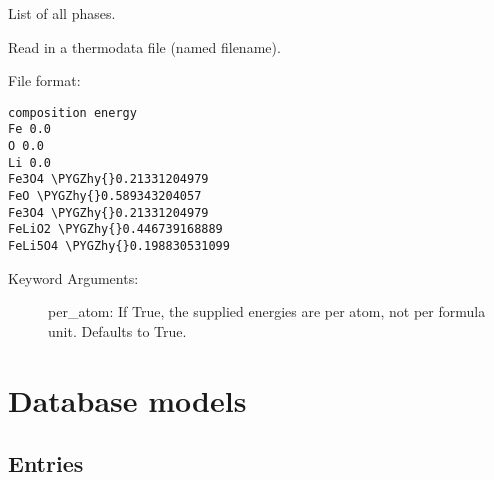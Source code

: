 \documentclass[letterpaper,10pt,english]{sphinxmanual}
\def\PYGZhy{\char`\-}
\begin{document}
\begin{fulllineitems}

\begin{fulllineitems}
\label{models:qmpy.PhaseData.phases}
List of all phases.

\end{fulllineitems}


\begin{fulllineitems}
\label{models:qmpy.PhaseData.read_file}
Read in a thermodata file (named filename).

File format:

\begin{Verbatim}[commandchars=\\\{\}]
composition energy
Fe 0.0
O 0.0
Li 0.0
Fe3O4 \PYGZhy{}0.21331204979
FeO \PYGZhy{}0.589343204057
Fe3O4 \PYGZhy{}0.21331204979
FeLiO2 \PYGZhy{}0.446739168889
FeLi5O4 \PYGZhy{}0.198830531099
\end{Verbatim}
\begin{description}
\item[{Keyword Arguments:}] \leavevmode
per\_atom: If True, the supplied energies are per atom, not per
formula unit. Defaults to True.

\end{description}

\end{fulllineitems}


\end{fulllineitems}



\section{Database models}
\label{models:database-models}

\subsection{Entries}
\label{models:entries}
\end{document}
